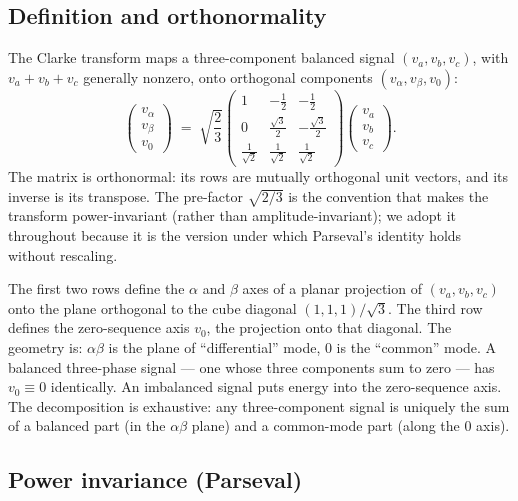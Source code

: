 \documentclass[
  11pt]{article}
\begin{document}
\subsection{Definition and
orthonormality}\label{definition-and-orthonormality}

The Clarke transform maps a three-component balanced signal
\((v_a, v_b, v_c)\), with \(v_a + v_b + v_c\) generally nonzero, onto
orthogonal components \((v_\alpha, v_\beta, v_0)\): \[
\begin{pmatrix} v_\alpha \\ v_\beta \\ v_0 \end{pmatrix} \;=\; \sqrt{\frac{2}{3}} \begin{pmatrix} 1 & -\tfrac{1}{2} & -\tfrac{1}{2} \\ 0 & \tfrac{\sqrt{3}}{2} & -\tfrac{\sqrt{3}}{2} \\ \tfrac{1}{\sqrt{2}} & \tfrac{1}{\sqrt{2}} & \tfrac{1}{\sqrt{2}} \end{pmatrix} \begin{pmatrix} v_a \\ v_b \\ v_c \end{pmatrix}.
\] The matrix is orthonormal: its rows are mutually orthogonal unit
vectors, and its inverse is its transpose. The pre-factor \(\sqrt{2/3}\)
is the convention that makes the transform power-invariant (rather than
amplitude-invariant); we adopt it throughout because it is the version
under which Parseval's identity holds without rescaling.

The first two rows define the \(\alpha\) and \(\beta\) axes of a planar
projection of \((v_a, v_b, v_c)\) onto the plane orthogonal to the cube
diagonal \((1,1,1)/\sqrt{3}\). The third row defines the zero-sequence
axis \(v_0\), the projection onto that diagonal. The geometry is:
\(\alpha\beta\) is the plane of ``differential'' mode, \(0\) is the
``common'' mode. A balanced three-phase signal --- one whose three
components sum to zero --- has \(v_0 \equiv 0\) identically. An
imbalanced signal puts energy into the zero-sequence axis. The
decomposition is exhaustive: any three-component signal is uniquely the
sum of a balanced part (in the \(\alpha\beta\) plane) and a common-mode
part (along the \(0\) axis).

\subsection{Power invariance
(Parseval)}\label{power-invariance-parseval}
\end{document}

